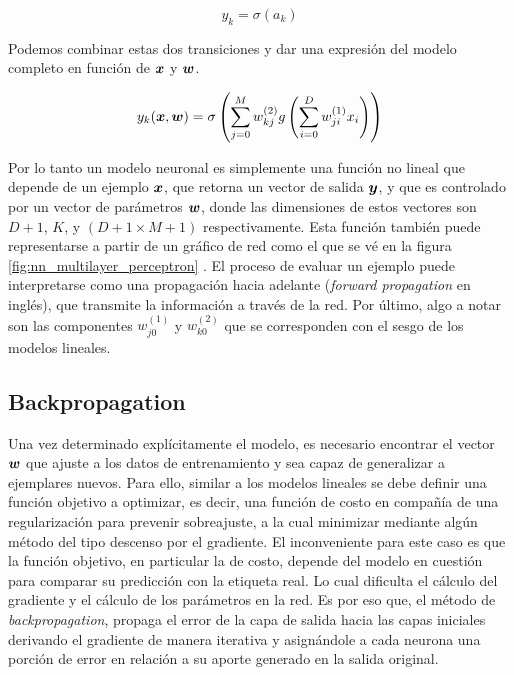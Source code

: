 \begin{equation}
    y_{k} = \sigma\left( a_k \right)
\end{equation}

Podemos combinar estas dos transiciones y dar una expresión del modelo completo
en función de $\boldsymbol{x}$ y $\boldsymbol{w}$.

\begin{equation}
    y_k(\boldsymbol{x}, \boldsymbol{w}) = \sigma\left(
                \sum_{j=0}^{M} w_{kj}^{(2)}
                    g\left( \sum_{i = 0}^{D} w_{ji}^{(1)} x_{i}
                \right)
            \right)
\end{equation}

Por lo tanto un modelo neuronal es simplemente una función no lineal que depende
de un ejemplo $\boldsymbol{x}$, que retorna un vector de salida $\boldsymbol{y}$, y que es
controlado por un vector de parámetros $\boldsymbol{w}$, donde las dimensiones de
estos vectores son $D + 1$, $K$, y $(D + 1 \times M + 1)$ respectivamente. Esta función
también puede representarse a partir de un gráfico de red como el que se vé en
la figura \ref{fig:nn_multilayer_perceptron} . El proceso de evaluar un ejemplo puede interpretarse como una
propagación hacia adelante (\emph{forward propagation} en inglés), que transmite
la información a través de la red. Por último, algo a notar son las componentes
$w_{j0}^{(1)}$ y $w_{k0}^{(2)}$ que se corresponden con el sesgo de los modelos
lineales.

\subsection{Backpropagation}
\label{subch:backpropagation}

Una vez determinado explícitamente el modelo, es necesario encontrar el vector
$\boldsymbol{w}$ que ajuste a los datos de entrenamiento y sea capaz de generalizar a
ejemplares nuevos. Para ello, similar a los modelos lineales se debe definir una
función objetivo a optimizar, es decir, una función de costo en compañía de una
regularización para prevenir sobreajuste, a la cual minimizar mediante algún
método del tipo descenso por el gradiente. El inconveniente para este caso es
que la función objetivo, en particular la de costo, depende del modelo en
cuestión para comparar su predicción con la etiqueta real. Lo cual dificulta el
cálculo del gradiente y el cálculo de los parámetros en la red. Es por eso que,
el método de \emph{backpropagation}, propaga el
error de la capa de salida hacia las capas iniciales derivando el gradiente de manera iterativa y asignándole a cada neurona una porción de error en relación a su aporte generado en la salida original.

